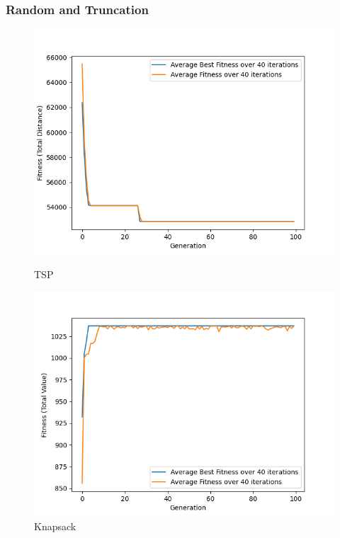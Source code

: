 \documentclass[11pt, letterpaper]{article}
\begin{document}
\subsubsection {Random and Truncation}
\begin{figure}[H]
  \includegraphics[width=\linewidth]{images/tsp_rd_tr.png}
  \caption{TSP}
\endminipage\hfill
{}
  \includegraphics[width=\linewidth]{images/knapsack_rd_tr.png}
  \caption{Knapsack}
\endminipage\hfill
{}%

\end{figure}
\end{document}
